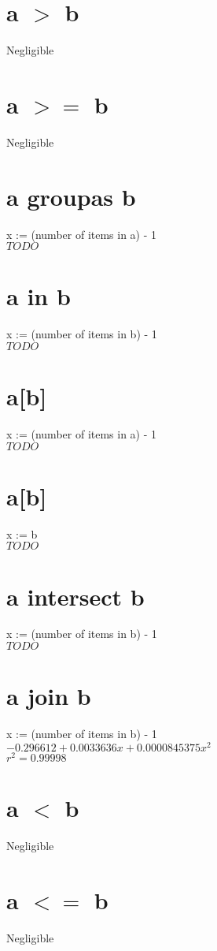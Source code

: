 \documentclass[12pt]{article}
\begin{document}
	\section{a $>$ b}
	Negligible
	
	\section{a $>=$ b}
	Negligible
	
	\section{a groupas b}
	x := (number of items in a) - 1\\
	$TODO$
	
	\section{a in b}
	x := (number of items in b) - 1\\
	$TODO$
	
	\section{a[b]}
	x := (number of items in a) - 1\\
	$TODO$
	
	\section{a[b]}
	x := b\\
	$TODO$
	
	\section{a intersect b}
	x := (number of items in b) - 1\\
	$TODO$
	
	\section{a join b}
	x := (number of items in b) - 1\\
	$-0.296612 + 0.0033636x + 0.0000845375x^2$\\
	$r^2 = 0.99998$
	
	\section{a $<$ b}
	Negligible
	
	\section{a $<=$ b}
	Negligible
	
\end{document}
